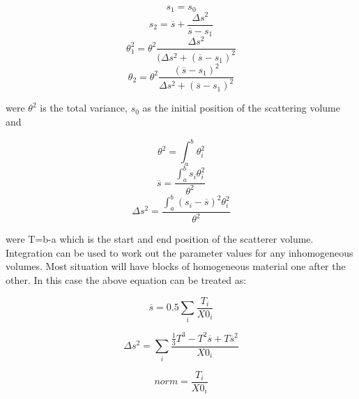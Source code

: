 \begin{multicols}{2}
\begin{equation}
 s_1 = s_0
\end{equation}
\begin{equation}
s_2 = \overline{s} + \frac{\Delta s^{2}}{\overline s - s_1} 
\end{equation}
\begin{equation}
\theta_{1}^{2} = \theta^{2}\frac{\Delta s^{2}}{(\Delta s^2 + (\overline s - s_1)^{2}} 
\end{equation}
\begin{equation}
\theta_{2} = \theta^{2}\frac{(\overline s - s_1)^{2}}{\Delta s^2 + (\overline s - s_1)^2} 
\end{equation}
\end{multicols}

were $\theta^{2}$ is the total variance, $s_0$ as the initial position of the scattering volume and 

\begin{multicols}{3}
\begin{equation}
\theta^{2} = \int_{a}^{b} \theta_{i}^{2}
\end{equation}
\begin{equation}
\overline{s}=\frac{\int_{a}^{b} s_i \theta_{i}^{2}}{\theta^2}
\end{equation}
\begin{equation}
\Delta s^{2} = \frac{\int_{a}^{b} ( s_i  - \overline{s})^2 \theta^{2}_{i}}{\theta^2}
\end{equation}
\end{multicols}

were T=b-a which is the start and end position of the scatterer volume. 
Integration can be used to work out the parameter values for any inhomogeneous volumes. Most situation will have blocks of homogeneous material one after the other. In this case the above equation can be treated as: 

\begin{equation}
 \overline{s} = 0.5 \sum_i \frac{T_i}{X0_i} 
\end{equation}

\begin{equation}
 \Delta s^{2} = \sum_i \frac{\frac{1}{3} T^3 - T^{2}\overline{s} + T\overline{s}^{2}}{X0_i} 
\end{equation}

\begin{equation}
 norm =   \frac{T_i}{X0_i} 
\end{equation}

